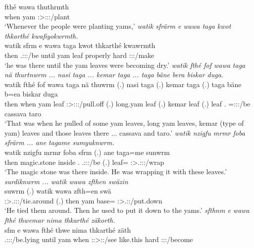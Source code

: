 \begin{exe}
	\gll fthé wawa thuthrmth\\ 
	when yam \Stpl:\Sbj>\Stpl:\Obj:\Pst:\Dur/plant\\
	\trans `Whenever the people were planting yams,'
	\emph{watik sfrärm e wawa taga kwot thkarthé kwafiyokwrmth.}\\
	\gll watik sfrm e wawa taga kwot thkarthé kwawrmth\\ 
	then \Tsg.\Masc:\Sbj:\Pst:\Dur/be until yam leaf properly hard \Stpl:\Sbj:\Pst:\Dur/make\\
	\trans `he was there until the yam leaves were becoming dry.'
	\emph{watik fthé fof wawa taga nä thurtnwrm ... nasi taga ... kemar taga ... taga bäne bera biskar duga.}\\
	\gll watik fthé fof wawa taga nä thuwrm (.) nasi taga (.) kemar taga (.) taga bäne b=ea biskar duga\\ 
	then when {\Emph} yam leaf {\Indf} \Sg:\Sbj>\Stpl:\Obj:\Pst:\Dur/pull.off (.) long.yam leaf (.) kemar leaf (.) leaf \Recog.{\Abs} \Med=\Stpl:\Sbj:\Pst:\Ipfv/be cassava taro\\
	\trans `That was when he pulled of some yam leaves, long yam leaves, kemar (type of yam) leaves and those leaves there ... cassava and taro.'
	\emph{watik nzigfu mrmr foba sfrärm ... ane tagame sumyuknwrm.}\\
	\gll watik nzigfu mrmr foba sfrm (.) ane taga=me sunwrm\\ 
	then magic.stone inside \Dist.{\Abl} \Tsg.\Masc:\Sbj:\Pst:\Dur/be (.) {\Dem} leaf={\Ins} \Sg:\Sbj>\Tsg.\Masc:\Obj:\Pst:\Dur/wrap\\
	\trans `The magic stone was there inside. He was wrapping it with these leaves.'
	\emph{surdiknwrm ... watik wawa zfthen swäzin}\\
	\gll suwrm (.) watik wawa zfth=en swä\\ 
	\Sg:\Sbj>\Tsg.\Masc:\Obj:\Pst:\Dur/tie.around (.) then yam base={\Loc} \Stsg:\Sbj>\Tsg.\Masc:\Obj:\Iter/put.down\\
	\trans `He tied them around. Then he used to put it down to the yams.'
	\emph{sfthnm e wawa fthé thwemar nima thkarthé zäkorth.}\\
	\gll sfm e wawa fthé thwe nima thkarthé zäth\\ 
	\Tsg.\Masc:\Sbj:\Pst:\Dur/be.lying until yam when \Stsg:\Sbj:>\Stpl:\Obj:\Iter/see like.this hard \Stpl:\Sbj:\Pst:\Pfv/become\\

\end{exe}
